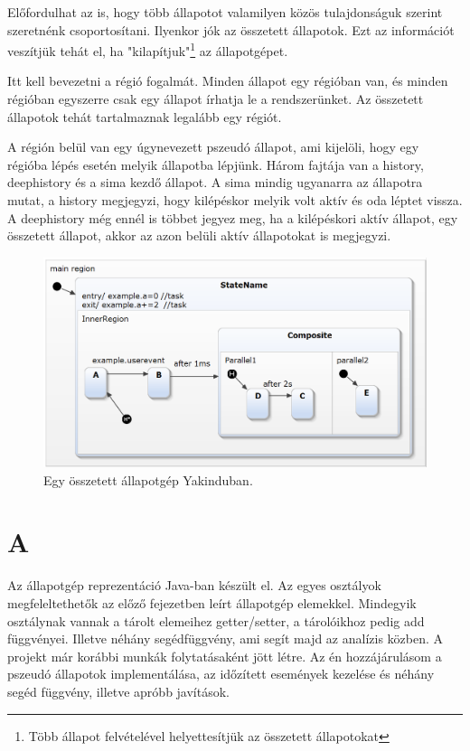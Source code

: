 Előfordulhat az is, hogy több állapotot valamilyen közös tulajdonságuk szerint szeretnénk csoportosítani. Ilyenkor jók az összetett állapotok.\label{infovesztes} Ezt az információt veszítjük tehát el, ha "kilapítjuk"\footnote{Több állapot felvételével helyettesítjük az összetett állapotokat} az állapotgépet.

Itt kell bevezetni a régió fogalmát. Minden állapot egy régióban van, és minden régióban egyszerre csak egy állapot írhatja le a rendszerünket. Az összetett állapotok tehát tartalmaznak legalább egy régiót.

A régión belül van egy úgynevezett pszeudó állapot, ami kijelöli, hogy egy régióba lépés esetén melyik állapotba lépjünk. Három fajtája van a history, deephistory és a sima kezdő állapot. A sima mindig ugyanarra az állapotra mutat, a history megjegyzi, hogy kilépéskor melyik volt aktív és oda léptet vissza. A deephistory még ennél is többet jegyez meg, ha a kilépéskori aktív állapot, egy összetett állapot, akkor az azon belüli aktív állapotokat is megjegyzi.

\begin{figure} [!ht]
	\centering
	\includegraphics[width=150mm, keepaspectratio]{figures/statechart.png}
	\caption{\label{fig:statechart}Egy összetett állapotgép Yakinduban.}
\end{figure}


\section{A {\thetaSc}}
\label{sec:thetaleiras}

Az állapotgép reprezentáció Java-ban készült el. Az egyes osztályok megfeleltethetők az előző fejezetben leírt állapotgép elemekkel. Mindegyik osztálynak vannak a tárolt elemeihez getter/setter, a tárolóikhoz pedig add függvényei. Illetve néhány segédfüggvény, ami segít majd az analízis közben. A projekt már korábbi munkák folytatásaként jött létre. Az én hozzájárulásom a pszeudó állapotok implementálása, az időzített események kezelése és néhány segéd függvény, illetve apróbb javítások.


